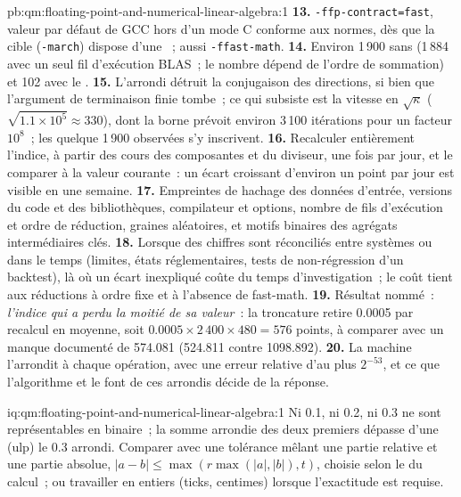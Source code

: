 \begin{solution}{pb:qm:floating-point-and-numerical-linear-algebra:1}
\textbf{13.} \texttt{-ffp-contract=fast}, valeur par défaut de GCC hors d'un mode C conforme aux normes, dès que la cible (\texttt{-march}) dispose d'une ~; aussi \texttt{-ffast-math}.
\textbf{14.} Environ 1\,900 sans  (1\,884 avec un seul fil d'exécution BLAS~; le nombre dépend de l'ordre de sommation) et 102 avec le .
\textbf{15.} L'arrondi détruit la conjugaison des directions, si bien que l'argument de terminaison finie tombe~; ce qui subsiste est la vitesse en $\sqrt\kappa$ ($\sqrt{1.1 \times 10^5} \approx 330$), dont la borne
prévoit environ 3\,100 itérations pour un facteur $10^8$~; les quelque 1\,900 observées s'y inscrivent.
\textbf{16.} Recalculer entièrement l'indice, à partir des cours des composantes et du diviseur, une fois par jour, et le comparer à la valeur courante~: un écart croissant d'environ un point par jour est visible en une semaine.
\textbf{17.} Empreintes de hachage des données d'entrée, versions du code et des bibliothèques, compilateur et options, nombre de fils d'exécution et ordre de réduction, graines aléatoires, et motifs binaires des agrégats intermédiaires clés.
\textbf{18.} Lorsque des chiffres sont réconciliés entre systèmes ou dans le temps (limites, états réglementaires, tests de non-régression d'un backtest), là où un écart inexpliqué coûte du temps d'investigation~; le coût tient
aux réductions à ordre fixe et à l'absence de fast-math.
\textbf{19.} Résultat nommé~: \emph{l'indice qui a perdu la moitié de sa valeur}~: la troncature retire 0.0005 par recalcul en moyenne, soit $0.0005 \times 2\,400 \times 480 = 576$ points, à comparer avec un manque documenté
de 574.081 (524.811 contre 1098.892).
\textbf{20.} La machine l'arrondit à chaque opération, avec une erreur relative d'au plus $2^{-53}$, et ce que l'algorithme et le  font de ces arrondis décide de la réponse.
\end{solution}

\begin{solution}{iq:qm:floating-point-and-numerical-linear-algebra:1}
Ni 0.1, ni 0.2, ni 0.3 ne sont représentables en binaire~; la somme arrondie des deux premiers dépasse d'une  (ulp) le 0.3 arrondi. Comparer avec une tolérance mêlant une partie relative et une partie absolue,
$|a - b| \le \max(r\max(|a|, |b|), t)$, choisie selon le  du calcul~; ou travailler en entiers (ticks, centimes) lorsque l'exactitude est requise.
\end{solution}

